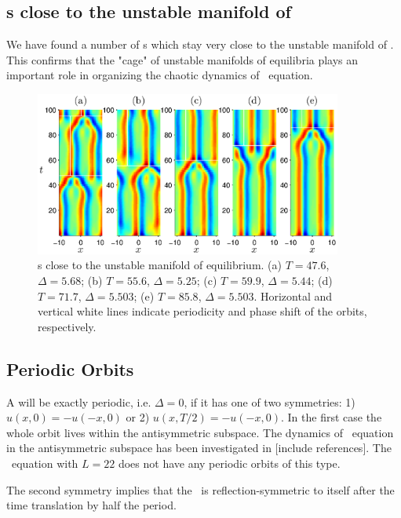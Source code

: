 \subsection{\Rpo s close to the unstable manifold of  }
We have found a number of \rpo s which stay very close to the
unstable manifold of .  This confirms that the "cage" of
unstable manifolds of equilibria plays an important role in
organizing the chaotic dynamics of \KS\ equation.

\begin{figure}[t]
\begin{center}
\includegraphics[width=0.9\textwidth]{figs/ks22rposCage.eps}
\end{center}
\caption{\Rpo s close to the unstable manifold of 
equilibrium. (a) $T = 47.6$, $\Delta = 5.68$; (b) $T = 55.6$,
$\Delta = 5.25$; (c) $T = 59.9$, $\Delta = 5.44$; (d) $T = 71.7$,
$\Delta = 5.503$; (e) $T = 85.8$, $\Delta = 5.503$. Horizontal and
vertical white lines indicate periodicity and phase shift of the
orbits, respectively. }\label{f:ks22rposCage}
\end{figure}

\subsection{Periodic Orbits} \label{ssec:po}
A \rpo will be exactly periodic, i.e. $\Delta = 0$, if it has one of
two symmetries: 1) $u(x,0) = -u(-x,0)$ or 2) $u(x,T/2) = -u(-x,0)$.
In the first case the whole orbit lives within the antisymmetric
subspace. The dynamics of \KS\ equation in the antisymmetric
subspace has been investigated in [include references]. The \KS\
equation with $L = 22$ does not have any periodic orbits of this
type.

The second symmetry implies that the \rpo\ is reflection-symmetric
to itself after the time translation by half the period.

